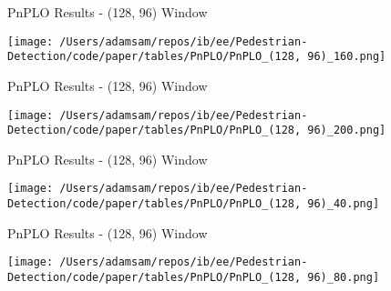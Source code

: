 \begin{table}
    \caption{PnPLO Results - (128, 96) Window}
    \texttt{[image: /Users/adamsam/repos/ib/ee/Pedestrian-Detection/code/paper/tables/PnPLO/PnPLO\_(128, 96)\_160.png]}
    \label{tab:PnPLO_(128, 96)_160}
\end{table}

\begin{table}
    \caption{PnPLO Results - (128, 96) Window}
    \texttt{[image: /Users/adamsam/repos/ib/ee/Pedestrian-Detection/code/paper/tables/PnPLO/PnPLO\_(128, 96)\_200.png]}
    \label{tab:PnPLO_(128, 96)_200}
\end{table}

\begin{table}
    \caption{PnPLO Results - (128, 96) Window}
    \texttt{[image: /Users/adamsam/repos/ib/ee/Pedestrian-Detection/code/paper/tables/PnPLO/PnPLO\_(128, 96)\_40.png]}
    \label{tab:PnPLO_(128, 96)_40}
\end{table}

\begin{table}
    \caption{PnPLO Results - (128, 96) Window}
    \texttt{[image: /Users/adamsam/repos/ib/ee/Pedestrian-Detection/code/paper/tables/PnPLO/PnPLO\_(128, 96)\_80.png]}
    \label{tab:PnPLO_(128, 96)_80}
\end{table}
